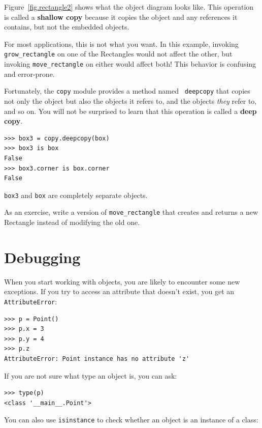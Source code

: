 \documentclass[10pt]{book}
\begin{document}
Figure~\ref{fig.rectangle2} shows what the object diagram looks like.
This operation is called a {\bf shallow copy} because it copies the
object and any references it contains, but not the embedded objects.

For most applications, this is not what you want.  In this example,
invoking \verb"grow_rectangle" on one of the Rectangles would not
affect the other, but invoking \verb"move_rectangle" on either would
affect both!  This behavior is confusing and error-prone.

Fortunately, the {\tt copy} module provides a method named {\tt
deepcopy} that copies not only the object but also
the objects it refers to, and the objects {\em they} refer to,
and so on.
You will not be surprised to learn that this operation is
called a {\bf deep copy}.

\begin{verbatim}
>>> box3 = copy.deepcopy(box)
>>> box3 is box
False
>>> box3.corner is box.corner
False
\end{verbatim}
%
{\tt box3} and {\tt box} are completely separate objects.

As an exercise, write a version of \verb"move_rectangle" that creates and
returns a new Rectangle instead of modifying the old one.


\section{Debugging}
\label{hasattr}

When you start working with objects, you are likely to encounter
some new exceptions.  If you try to access an attribute
that doesn't exist, you get an {\tt AttributeError}:

\begin{verbatim}
>>> p = Point()
>>> p.x = 3
>>> p.y = 4
>>> p.z
AttributeError: Point instance has no attribute 'z'
\end{verbatim}
%
If you are not sure what type an object is, you can ask:

\begin{verbatim}
>>> type(p)
<class '__main__.Point'>
\end{verbatim}
%
You can also use {\tt isinstance} to check whether an object
is an instance of a class:
\end{document}
